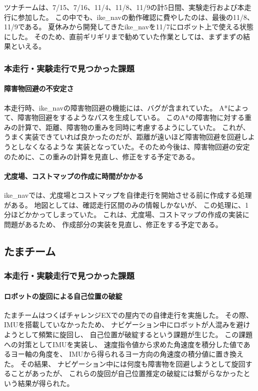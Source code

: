 \documentclass[twocolumn,9pt]{jsproceedings}
\begin{document}
ツナチームは、7/15、7/16、11/4、11/8、11/9の計5日間、実験走行および本走行に参加した。
この中でも、ike\_navの動作確認に費やしたのは、最後の11/8、11/9である。
夏休みから開発してきたike\_navを11/7にロボット上で使える状態にした。
そのため、直前ギリギリまで勧めていた作業としては、まずまずの結果といえる。

\subsubsection{本走行・実験走行で見つかった課題}
\paragraph{障害物回避の不安定さ}
本走行時、ike\_navの障害物回避の機能には、バグが含まれていた。
A*によって、障害物回避をするようなパスを生成している。
このA*の障害物に対する重みの計算で、距離、障害物の重みを同時に考慮するようにしていた。
これが、うまく実装できていれば良かったのだが、距離が遠いほど障害物回避を回避しようとしなくなるような
実装となっていた。そのため今後は、障害物回避の安定のために、この重みの計算を見直し、修正をする予定である。

\paragraph{尤度場、コストマップの作成に時間がかかる}
ike\_navでは、尤度場とコストマップを自律走行を開始させる前に作成する処理がある。
地図としては、確認走行区間のみの情報しかないが、
この処理に、1分ほどかかってしまっていた。
これは、尤度場、コストマップの作成の実装に問題があるため、
作成部分の実装を見直し、修正をする予定である。

\subsection{たまチーム}
\subsubsection{本走行・実験走行で見つかった課題}
\paragraph{ロボットの旋回による自己位置の破綻}


たまチームはつくばチャレンジEXでの屋内での自律走行を実施した。
その際、IMUを搭載していなかったため、
ナビゲーション中にロボットが人混みを避けようとして頻繁に旋回し、
自己位置が破綻するという課題が生じた。
この課題への対策としてIMUを実装し、
速度指令値から求めた角速度を積分した値であるヨー軸の角度を、
IMUから得られるヨー方向の角速度の積分値に置き換えた。
その結果、
ナビゲーション中には何度も障害物を回避しようとして旋回することがあったが、
これらの旋回が自己位置推定の破綻には繋がらなかったという結果が得られた。
\end{document}
